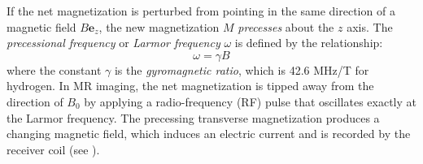 If the net magnetization is perturbed from pointing in the same direction of a magnetic field $B\bm{e}_z$, the new magnetization $M$ \textit{precesses} about the $z$ axis. The \textit{precessional frequency} or \textit{Larmor frequency} $\omega$ is defined by the relationship:
\begin{equation}
\omega = \gamma B
\end{equation}
where the constant $\gamma$ is the \textit{gyromagnetic ratio}, which is 42.6 MHz/T for hydrogen. In MR imaging, the net magnetization is tipped away from the direction of $B_0$ by applying a radio-frequency (RF) pulse that oscillates exactly at the Larmor frequency. The precessing transverse magnetization produces a changing magnetic field, which induces an electric current and is recorded by the receiver coil (see ).

